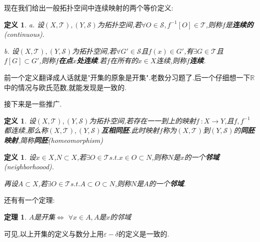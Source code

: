 \documentclass[UTF8]{article}
\begin{document}
	现在我们给出一般拓扑空间中连续映射的两个等价定义:
	
	\newtheorem*{continuous}{定义}
	
	\begin{continuous}
		
		a. 设$(X,\mathscr{T}),(Y,\mathscr{S})$为拓扑空间,若$\forall O \in \mathscr{S}, f^{-1}[O] \in \mathscr{T}$,则称$f$是\textbf{连续的}(continuous).
		
		b. 设$(X,\mathscr{T}),(Y,\mathscr{S})$为拓扑空间,若$\forall G' \in \mathscr{S}$且$f(x) \in G'$,有$\exists G \in \mathscr{T}$且$f[G] \subset G'$,则称$f$\textbf{在点$x$处连续}.若$f$在所有的$x \in X$连续,则称$f$\textbf{连续}.
		
	\end{continuous}
	
	前一个定义翻译成人话就是"开集的原象是开集".老数分习题了.后一个仔细想一下$\mathbb{R}$中的情况与欧氏范数,就能发现是一致的.
	
	接下来是一些推广.
	
	\newtheorem*{homeomorphic}{定义}
	
	\begin{homeomorphic}
		设$(X,\mathscr{T}),(Y,\mathscr{S})$为拓扑空间,若存在一一到上的映射$f~:X \to Y$,且$f,f^{-1}$都连续,那么称$(X,\mathscr{T}),(Y,\mathscr{S})$\textbf{互相同胚}.此时映射$f$称为$(X,\mathscr{T})$到$(Y,\mathscr{S})$的\textbf{同胚映射},简称\textbf{同胚}(homeomorphism)
	\end{homeomorphic}
	
	\newtheorem*{neighborhood}{定义}
	
	\begin{neighborhood}
		
		设$x \in X$,$N \subset X$,若$\exists O \in \mathscr{T} s.t. x \in O \subset N$,则称$N$是$x$的一个\textbf{邻域}(neighborhoood).
		
		再设$A \subset X$,若$\exists O \in \mathscr{T} s.t. A \subset O \subset N$,则称$N$是$A$的一个\textbf{邻域}.
		
	\end{neighborhood}
	
	还有有一个定理:
	
	\newtheorem*{neighborhoodEquivalence}{定理}
	
	\begin{neighborhoodEquivalence}
		$A$是开集$\Leftrightarrow$ $\forall x \in A, A$是$x$的邻域
	\end{neighborhoodEquivalence}
	
	可见,以上开集的定义与数分上用$\varepsilon-\delta$的定义是一致的.
	
\end{document}
